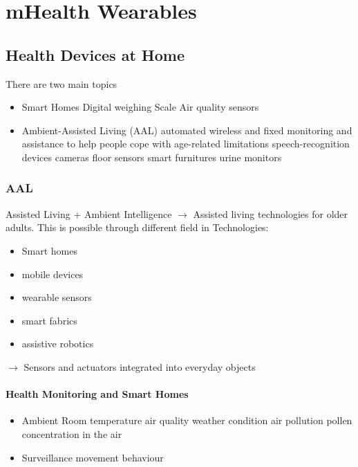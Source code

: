 \documentclass{report}
\theoremstyle{definition}
\theoremstyle{example}
\begin{document}
\chapter{mHealth Wearables}

\section{Health Devices at Home}
There are two main topics
\begin{itemize}
   \item Smart Homes
   \subitem Digital weighing Scale
   \subitem Air quality sensors 
   \item Ambient-Assisted Living (AAL)
   \subitem automated wireless and fixed monitoring and assistance to help people cope with age-related limitations
   \subitem speech-recognition devices
   \subitem cameras
   \subitem floor sensors
   \subitem smart furnitures
   \subitem urine monitors
\end{itemize}

\subsection{AAL}
Assisted Living + Ambient Intelligence $\rightarrow$ Assisted living technologies for older adults. This is possible through different field in Technologies:
\begin{itemize}
   \item Smart homes
   \item mobile devices
   \item wearable sensors
   \item smart fabrics
   \item assistive robotics
\end{itemize}
$\rightarrow$ Sensors and actuators integrated into everyday objects

\subsubsection{Health Monitoring and Smart Homes}
\begin{itemize}
   \item Ambient
   \subitem Room temperature
   \subitem air quality
   \subitem weather condition
   \subitem air pollution
   \subitem pollen concentration in the air
   \item Surveillance
   \subitem movement
   \subitem behaviour
\end{itemize}
\end{document}
